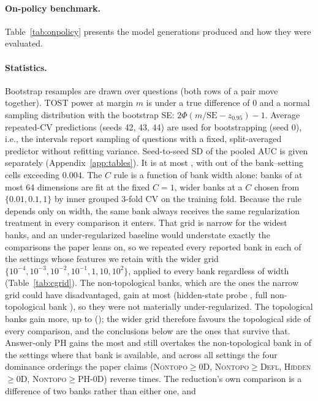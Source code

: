 \paragraph{On-policy benchmark.} Table~\ref{tab:onpolicy} presents the model generations produced and how they were evaluated.
\begin{table}[h]
\centering
\small
\caption{\textbf{TriviaQA on-policy benchmark.} $2{,}000$ validation questions sampled with seed 0; greedy decoding, first line of the answer, at most 24 new tokens. An answer is correct if any normalized gold alias (lower-cased, punctuation and articles removed) is contained as a whole-word span in the normalized answer. Empty answers are dropped.}
\label{tab:onpolicy}
\SinkTableOnpolicy
\end{table}

\paragraph{Statistics.} Bootstrap resamples are drawn over questions (both rows of a pair move together). TOST power at margin $m$ is under a true difference of 0 and a normal sampling distribution with the bootstrap SE: $2\Phi(m/\mathrm{SE}-z_{0.95})-1$. Average repeated-CV predictions (seeds 42, 43, 44) are used for bootstrapping (seed 0), i.e., the intervals report sampling of questions with a fixed, split-averaged predictor without refitting variance. Seed-to-seed SD of the pooled AUC is given separately (Appendix~\ref{app:tables}). It is at most \MaxSeedSD{}, with \NSeedSDAbove{} out of the bank--setting cells exceeding $0.004$. The $C$ rule is a function of bank width alone: banks of at most 64 dimensions are fit at the fixed $C=1$, wider banks at a $C$ chosen from $\{0.01,0.1,1\}$ by inner grouped 3-fold CV on the training fold. Because the rule depends only on width, the same bank always receives the same regularization treatment in every comparison it enters. That grid is narrow for the widest banks, and an under-regularized baseline would understate exactly the comparisons the paper leans on, so we repeated every reported bank in each of the \CGridN{} settings whose features we retain with the wider grid $\{10^{-4},10^{-3},10^{-2},10^{-1},1,10,10^{2}\}$, applied to every bank regardless of width (Table~\ref{tab:cgrid}). The non-topological banks, which are the ones the narrow grid could have disadvantaged, gain at most \CGridNTMax{} (hidden-state probe \CGridHiddenMax{}, full non-topological bank \CGridNTBankMax{}), so they were not materially under-regularized. The topological banks gain more, up to \CGridTopoMax{} (\CGridWorst{}); the wider grid therefore favours the topological side of every comparison, and the conclusions below are the ones that survive that. Answer-only PH gains the most and still overtakes the non-topological bank in \CGridAnsOverNT{} of the settings where that bank is available, and across all settings the four dominance orderings the paper claims (\textsc{Nontopo}${}\ge{}$\textsc{0D}, \textsc{Nontopo}${}\ge{}$\textsc{Defl}, \textsc{Hidden}${}\ge{}$\textsc{0D}, \textsc{Nontopo}${}\ge{}$\textsc{PH-0D}) reverse \CGridFlips{} times. The reduction's own comparison is a difference of two banks rather than either one, and 